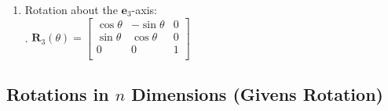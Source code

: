 \begin{enumerate}
    \item Rotation about the $\bm{e}_3$-axis:
    \hfill \cite{mfml/book/mml/Deisenroth-Faisal-Ong}
    \\
    .\hfill
    $
        \bm{R}_3(\theta)
        = \begin{bmatrix}
        \cos \theta &   -\sin \theta & 0\\
        \sin \theta &  \cos \theta & 0\\
        0 & 0 & 1 \\
        \end{bmatrix}
    $
    \hfill \cite{mfml/book/mml/Deisenroth-Faisal-Ong}

\end{enumerate}


\subsection{Rotations in $n$ Dimensions (Givens Rotation)}

